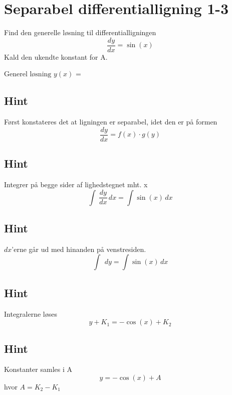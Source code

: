 \documentclass{article}
\newenvironment{exercise}[1]{\newpage\section{#1}}{}
\newcommand{\answerbox}[1]{\fbox{$#1$}}
\newcommand{\hint}{\subsection*{Hint}}
\begin{document}
\newpage

\begin{exercise}{Separabel differentialligning 1-3}


	Find den generelle løsning til differentialligningen 
	\[
	\frac{dy}{dx} = \sin(x)
	\]
	Kald den ukendte konstant for A.
	
	$\textrm{Generel løsning } y(x)$ = \answerbox{- \cos(x) + A}
	
	\hint
	
	Først konstateres det at ligningen er separabel, idet den er på formen
	\[
	\frac{dy}{dx} = f(x) \cdot g(y)
	\]
	
	\hint
	
	Integrer på begge sider af lighedstegnet mht. x
	\[
	\int\ \frac{dy}{dx}\, dx= \int \sin (x)\,dx
	\]
	
	\hint
	
	$dx$'erne går ud med hinanden på venstresiden.
	\[
	\int\ \, dy= \int \sin(x)\,dx
	\]
	
	\hint
	
	Integralerne løses
	\[
	y + K_1 =- \cos (x) + K_2
	\]
	
	
	\hint
	
	Konstanter samles i A
	\[
	y = - \cos(x) + A
	\]
	hvor $A=K_2-K_1$
	
\end{exercise}


\newpage
\end{document}
